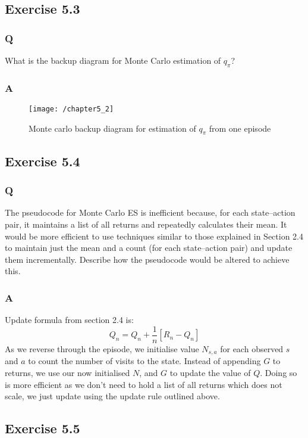\subsection*{Exercise 5.3}
\subsubsection{Q}
What is the backup diagram for Monte Carlo estimation of $q_\pi$?
\subsubsection{A}
\begin{figure}[h!]
	\centering
	\texttt{[image: /chapter5\_2]}
	\caption{Monte carlo backup diagram for estimation of $q_\pi$ from one episode}
	\label{fig:monte carlo qpi}
\end{figure}

\subsection*{Exercise 5.4}
\subsubsection{Q}
The pseudocode for Monte Carlo ES is inefficient because, for each state–action pair, it maintains a list of all returns and repeatedly calculates their mean. It would be more efficient to use techniques similar to those explained in Section 2.4 to maintain just the mean and a count (for each state–action pair) and update them incrementally. Describe how the pseudocode would be altered to achieve this.
\subsubsection{A}
Update formula from section 2.4 is:
\begin{equation}
	Q_n = Q_n + \frac{1}{n}\left[R_n - Q_n\right]
\end{equation}
As we reverse through the episode, we initialise value $N_{s,a}$ for each observed $s$ and $a$ to count the number of visits to the state. Instead of appending $G$ to returns, we use our now initialised $N$, and $G$ to update the value of $Q$. Doing so is more efficient as we don't need to hold a list of all returns which does not scale, we just update using the update rule outlined above.

\subsection*{Exercise 5.5}
